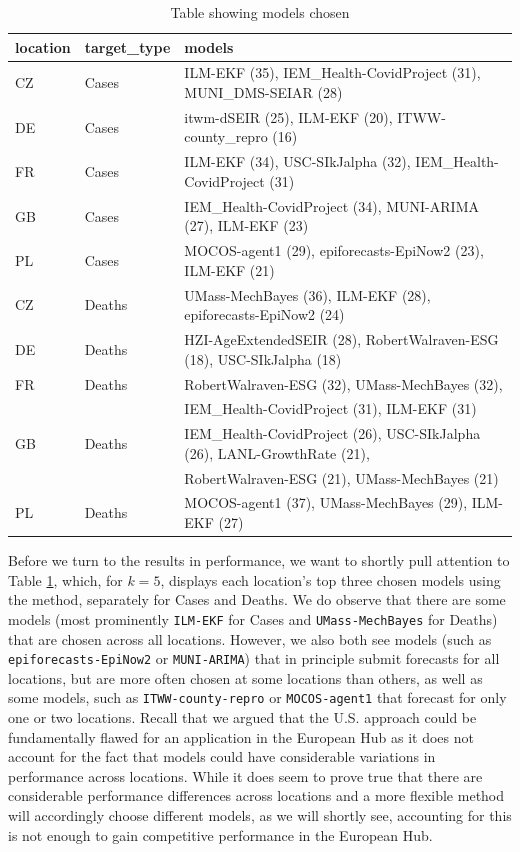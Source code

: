 \begin{table}[t]
\centering
\begin{tabular}{lll}
\hline
location & target\_type & models\\
\hline
CZ & Cases & ILM-EKF (35), IEM\_Health-CovidProject (31), MUNI\_DMS-SEIAR (28)\\[0.1em]
DE & Cases & itwm-dSEIR (25), ILM-EKF (20), ITWW-county\_repro (16)\\[0.1em]
FR & Cases & ILM-EKF (34), USC-SIkJalpha (32), IEM\_Health-CovidProject (31)\\[0.1em]
GB & Cases & IEM\_Health-CovidProject (34), MUNI-ARIMA (27), ILM-EKF (23)\\[0.1em]
PL & Cases & MOCOS-agent1 (29), epiforecasts-EpiNow2 (23), ILM-EKF (21)\\[0.8em]
CZ & Deaths & UMass-MechBayes (36), ILM-EKF (28), epiforecasts-EpiNow2 (24)\\[0.1em]
DE & Deaths & HZI-AgeExtendedSEIR (28), RobertWalraven-ESG (18), USC-SIkJalpha (18)\\[0.1em]
FR & Deaths & RobertWalraven-ESG (32), UMass-MechBayes (32),\\
& & IEM\_Health-CovidProject (31), ILM-EKF (31)\\[0.1em]
GB & Deaths & IEM\_Health-CovidProject (26), USC-SIkJalpha (26), LANL-GrowthRate (21), \\
& & RobertWalraven-ESG (21), UMass-MechBayes (21)\\[0.1em]
PL & Deaths & MOCOS-agent1 (37), UMass-MechBayes (29), ILM-EKF (27)\\
\hline
\end{tabular}
\caption{Table showing models chosen}
\label{tab:bp_chosenmods}
\end{table}
Before we turn to the results in performance, we want to shortly pull attention to Table \ref{tab:bp_chosenmods}, which, for $k = 5$, displays each location's top three chosen models using the method, separately for Cases and Deaths. We do observe that there are some models (most prominently \texttt{ILM-EKF} for Cases and \texttt{UMass-MechBayes} for Deaths) that are chosen across all locations. However, we also both see models (such as \texttt{epiforecasts-EpiNow2} or \texttt{MUNI-ARIMA}) that in principle submit forecasts for all locations, but are more often chosen at some locations than others, as well as some models, such as \texttt{ITWW-county-repro} or \texttt{MOCOS-agent1} that forecast for only one or two locations. Recall that we argued that the U.S. approach could be fundamentally flawed for an application in the European Hub as it does not account for the fact that models could have considerable variations in performance across locations. While it does seem to prove true that there are considerable performance differences across locations and a more flexible method will accordingly choose different models, as we will shortly see, accounting for this is not enough to gain competitive performance in the European Hub.\medskip\\

